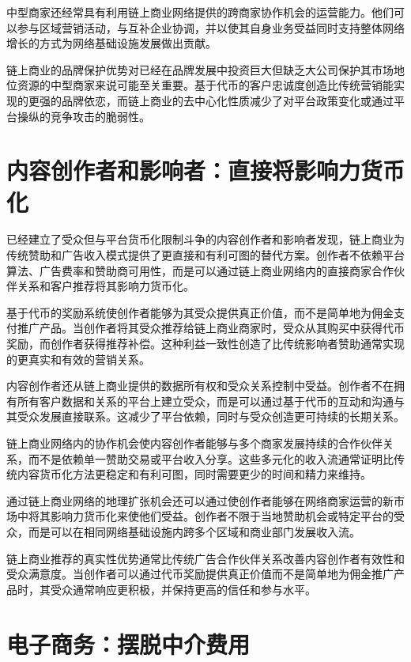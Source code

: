 \documentclass[
  Letterpaper,
]{scrbook}
\begin{document}
中型商家还经常具有利用链上商业网络提供的跨商家协作机会的运营能力。他们可以参与区域营销活动，与互补企业协调，并以使其自身业务受益同时支持整体网络增长的方式为网络基础设施发展做出贡献。

链上商业的品牌保护优势对已经在品牌发展中投资巨大但缺乏大公司保护其市场地位资源的中型商家来说可能至关重要。基于代币的客户忠诚度创造比传统营销能实现的更强的品牌依恋，而链上商业的去中心化性质减少了对平台政策变化或通过平台操纵的竞争攻击的脆弱性。

\section{内容创作者和影响者：直接将影响力货币化}\label{ux5185ux5bb9ux521bux4f5cux8005ux548cux5f71ux54cdux8005ux76f4ux63a5ux5c06ux5f71ux54cdux529bux8d27ux5e01ux5316}

已经建立了受众但与平台货币化限制斗争的内容创作者和影响者发现，链上商业为传统赞助和广告收入模式提供了更直接和有利可图的替代方案。创作者不依赖平台算法、广告费率和赞助商可用性，而是可以通过链上商业网络内的直接商家合作伙伴关系和客户推荐将其影响力货币化。

基于代币的奖励系统使创作者能够为其受众提供真正价值，而不是简单地为佣金支付推广产品。当创作者将其受众推荐给链上商业商家时，受众从其购买中获得代币奖励，而创作者获得推荐补偿。这种利益一致性创造了比传统影响者赞助通常实现的更真实和有效的营销关系。

内容创作者还从链上商业提供的数据所有权和受众关系控制中受益。创作者不在拥有所有客户数据和关系的平台上建立受众，而是可以通过基于代币的互动和沟通与其受众发展直接联系。这减少了平台依赖，同时与受众创造更可持续的长期关系。

链上商业网络内的协作机会使内容创作者能够与多个商家发展持续的合作伙伴关系，而不是依赖单一赞助交易或平台收入分享。这些多元化的收入流通常证明比传统内容货币化方法更稳定和有利可图，同时需要更少的时间和精力来维持。

通过链上商业网络的地理扩张机会还可以通过使创作者能够在网络商家运营的新市场中将其影响力货币化来使他们受益。创作者不限于当地赞助机会或特定平台的受众，而是可以在相同网络基础设施内跨多个区域和商业部门发展收入流。

链上商业推荐的真实性优势通常比传统广告合作伙伴关系改善内容创作者有效性和受众满意度。当创作者可以通过代币奖励提供真正价值而不是简单地为佣金推广产品时，其受众通常响应更积极，并保持更高的信任和参与水平。

\section{电子商务：摆脱中介费用}\label{ux7535ux5b50ux5546ux52a1ux6446ux8131ux4e2dux4ecbux8d39ux7528}
\end{document}

